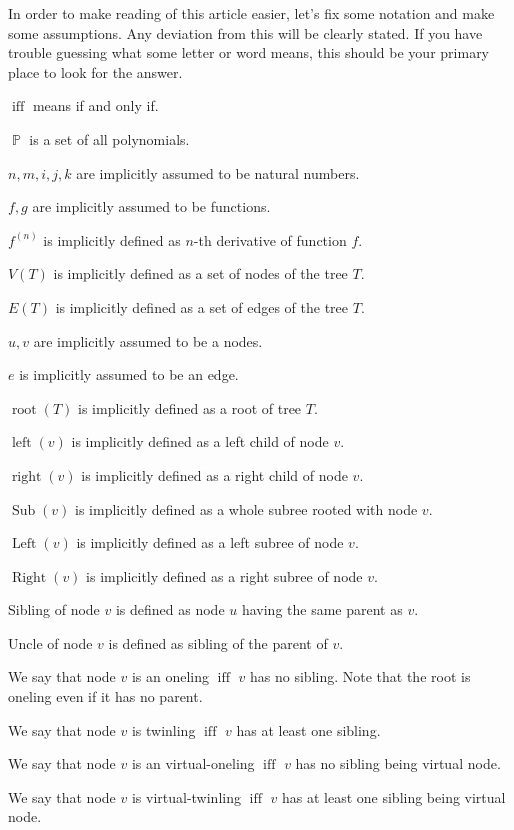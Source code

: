 \documentclass[final]{article}
\theoremstyle{definition}
\theoremstyle{remark}
\DeclareMathOperator{\textiff}{\text{iff}}
\DeclareMathOperator{\poly}{\mathbb{P}}
\DeclareMathOperator{\troot}{\text{root}}
\DeclareMathOperator{\tleft}{\text{left}}
\DeclareMathOperator{\tright}{\text{right}}
\DeclareMathOperator{\tLeft}{\text{Left}}
\DeclareMathOperator{\tRight}{\text{Right}}
\DeclareMathOperator{\tSub}{\text{Sub}}
\begin{document}
In order to make reading of this article easier, let's fix some notation and make some assumptions. Any deviation from this will be clearly stated. If you have trouble guessing what some letter or word means, this should be your primary place to look for the answer.

\(\textiff\) means if and only if.

\(\poly\) is a set of all polynomials.

\(n, m, i, j, k\) are implicitly assumed to be natural numbers.

\(f, g\) are implicitly assumed to be functions.

\(f^{(n)}\) is implicitly defined as \(n\)-th derivative of function \(f\).

\(V(T)\) is implicitly defined as a set of nodes of the tree \(T\).

\(E(T)\) is implicitly defined as a set of edges of the tree \(T\).

\(u, v\) are implicitly assumed to be a nodes.

\(e\) is implicitly assumed to be an edge.

\(\troot(T)\) is implicitly defined as a root of tree \(T\).

\(\tleft(v)\) is implicitly defined as a left child of node \(v\).

\(\tright(v)\) is implicitly defined as a right child of node \(v\).

\(\tSub(v)\) is implicitly defined as a whole subree rooted with node \(v\).

\(\tLeft(v)\) is implicitly defined as a left subree of node \(v\).

\(\tRight(v)\) is implicitly defined as a right subree of node \(v\).

Sibling of node \(v\) is defined as node \(u\) having the same parent as \(v\).

Uncle of node \(v\) is defined as sibling of the parent of \(v\).

We say that node \(v\) is an oneling \(\textiff\) \(v\) has no sibling. Note that the root is oneling even if it has no parent.

We say that node \(v\) is twinling \(\textiff\) \(v\) has at least one sibling.

We say that node \(v\) is an virtual-oneling \(\textiff\) \(v\) has no sibling being virtual node.

We say that node \(v\) is virtual-twinling \(\textiff\) \(v\) has at least one sibling being virtual node.
\end{document}
